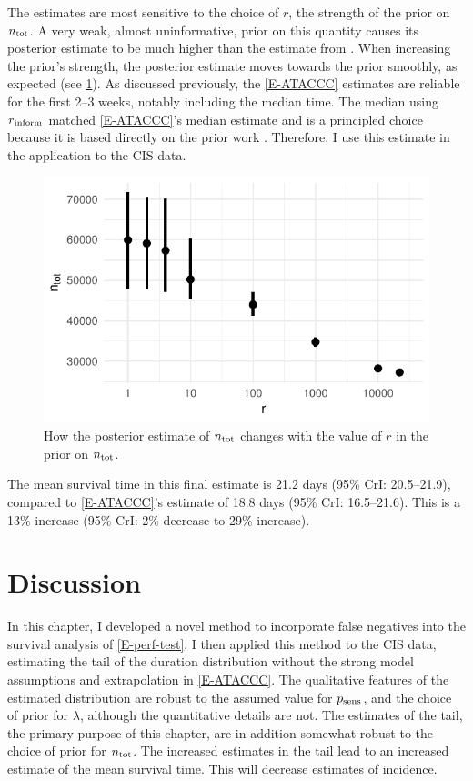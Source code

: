 \documentclass[thesis.tex]{subfiles}
\begin{document}
The estimates are most sensitive to the choice of $r$, the strength of the prior on $\ntot$.
A very weak, almost uninformative, prior on this quantity causes its posterior estimate to be much higher than the estimate from \textcite{birrellRTM2}.
When increasing the prior's strength, the posterior estimate moves towards the prior smoothly, as expected (see \cref{imperf-test:fig:ntot}).
As discussed previously, the \cref{E-ATACCC} estimates are reliable for the first 2--3 weeks, notably including the median time.
The median using $r{_{\text{inform}}}$ matched \cref{E-ATACCC}'s median estimate and is a principled choice because it is based directly on the prior work \textcite{birrellRTM2}.
Therefore, I use this estimate in the application to the CIS data.
\begin{figure}
  \centering \includegraphics{cis-imperfect-testing/CIS_ntot}
  \caption[Sensitivity of estimates of $\ntot$ to the prior.]{How the posterior estimate of $\ntot$ changes with the value of $r$ in the prior on $\ntot$.}
  \label{imperf-test:fig:ntot}
\end{figure}

The mean survival time in this final estimate is 21.2 days (95\% CrI: 20.5--21.9), compared to \cref{E-ATACCC}'s estimate of 18.8 days (95\% CrI: 16.5--21.6).
This is a 13\% increase (95\% CrI: 2\% decrease to 29\% increase).

\section{Discussion} \label{imperf-test:sec:discussion}

In this chapter, I developed a novel method to incorporate false negatives into the survival analysis of \cref{E-perf-test}.
I then applied this method to the CIS data, estimating the tail of the duration distribution without the strong model assumptions and extrapolation in \cref{E-ATACCC}.
The qualitative features of the estimated distribution are robust to the assumed value for $p_\text{sens}$, and the choice of prior for $\lambda$, although the quantitative details are not.
The estimates of the tail, the primary purpose of this chapter, are in addition somewhat robust to the choice of prior for $\ntot$.
The increased estimates in the tail lead to an increased estimate of the mean survival time.
This will decrease estimates of incidence.
\end{document}
